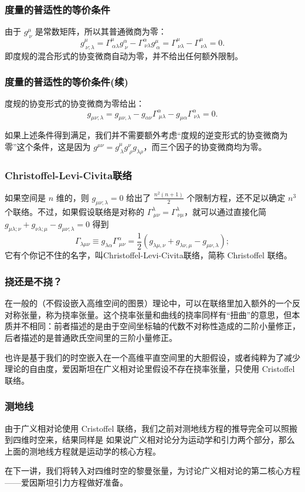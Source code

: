 \documentclass[CJK,13pt]{beamer}
\begin{document}
\begin{frame}
  \frametitle{度量的普适性的等价条件}
  由于 $g^\mu_{\ \nu}$ 是常数矩阵，所以其普通微商为零：
  $$g^\mu_{\ \nu;\lambda} = \Gamma^\mu_{\ \alpha\lambda}g^\alpha_{\ \nu} - \Gamma^\alpha_{\ \nu\lambda}g^\mu_{\ \alpha} = \Gamma^\mu_{\ \nu\lambda} - \Gamma^\mu_{\ \nu\lambda} = 0.$$
  即度规的混合形式的协变微商自动为零，并不给出任何额外限制。
\end{frame}


\begin{frame}
  \frametitle{度量的普适性的等价条件(续)}
  度规的协变形式的协变微商为零给出：
  $$g_{\mu\nu;\lambda} = g_{\mu\nu,\lambda}-g_{\alpha\nu}\Gamma^\alpha_{\ \mu\lambda}-g_{\mu\alpha}\Gamma^\alpha_{\ \nu\lambda}=0.$$
  
  如果上述条件得到满足，我们并不需要额外考虑“度规的逆变形式的协变微商为零”这个条件，这是因为 $g^{\mu\nu} = g^\mu_{\ \lambda}g^\nu_{\ \rho} g_{\lambda\rho}$，而三个因子的协变微商均为零。
\end{frame}

\begin{frame}
  \frametitle{Christoffel-Levi-Civita联络}
    如果空间是 $n$ 维的，则 $g_{\mu\nu;\lambda}= 0$ 给出了 $\frac{n^2(n+1)}{2}$ 个限制方程，还不足以确定 $n^3$ 个联络。不过，{\blue 如果假设联络是对称的 $\Gamma^\lambda_{\ \mu\nu}=\Gamma^\lambda_{\ \nu\mu}$}，就可以通过直接化简 $g_{\mu\lambda;\nu}+g_{\nu\lambda;\mu}-g_{\mu\nu;\lambda}=0$ 得到
  {\blue  $$\Gamma_{\lambda\mu\nu}\equiv g_{\lambda\alpha}\Gamma^\alpha_{\ \mu\nu}=\frac{1}{2}\left(g_{\lambda\mu,\nu}+g_{\lambda\nu,\mu}-g_{\mu\nu,\lambda}\right);$$}
  它有个你记不住的名字，叫{\blue Christoffel-Levi-Civita联络，简称 Christoffel 联络}。

\end{frame}


\begin{frame}
  \frametitle{挠还是不挠？}
  在一般的（不假设嵌入高维空间的图景）理论中，可以在联络里加入额外的一个反对称张量，称为{\blue 挠率张量}。这个挠率张量和曲线的挠率同样有“扭曲”的意思，但本质并不相同：前者描述的是由于空间坐标轴的代数不对称性造成的二阶小量修正，后者描述的是普通欧氏空间里的三阶小量修正。

  
  也许是基于我们的时空嵌入在一个高维平直空间里的大胆假设，或者纯粹为了减少理论的自由度，爱因斯坦在{\blue 广义相对论里假设不存在挠率张量，只使用 Cristoffel 联络}。
\end{frame}

\begin{frame}
  \frametitle{测地线}
  由于广义相对论使用 Cristoffel 联络，我们之前对测地线方程的推导完全可以照搬到四维时空来，结果同样是
  如果说广义相对论分为运动学和引力两个部分，那么上面的测地线方程就是运动学的核心方程。
\end{frame}


\begin{frame}
  在下一讲，我们将转入对四维时空的黎曼张量，为讨论广义相对论的第二核心方程——爱因斯坦引力方程做好准备。
\end{frame}

\ech
\end{document}
